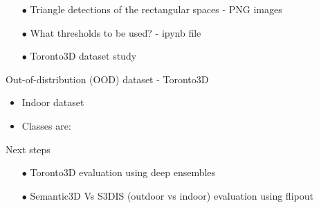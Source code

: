\documentclass[aspectratio=169]{beamer}
\begin{document}
\begin{frame}
    \begin{itemize}
        \item[$\bullet$] Triangle detections of the rectangular spaces - PNG images
        \item[$\bullet$] What thresholds to be used? - ipynb file
        \item[$\bullet$] Toronto3D dataset study  
    \end{itemize}
\end{frame}
\begin{frame}{Out-of-distribution (OOD) dataset - Toronto3D}
    \begin{itemize}
        \item Indoor dataset
        \item Classes are:
    \end{itemize}
    \begin{table}
        \caption{Classes in both the datasets, In-distribution (ID) dataset is Semantic3D and OOD dataset is Toronto3D}
    \end{table}
\end{frame}
\begin{frame}{Next steps}
    \begin{itemize}
        \item[$\bullet$] Toronto3D evaluation using deep ensembles
        \item[$\bullet$] Semantic3D Vs S3DIS (outdoor vs indoor) evaluation using flipout  
    \end{itemize}
\end{frame}
\end{document}
